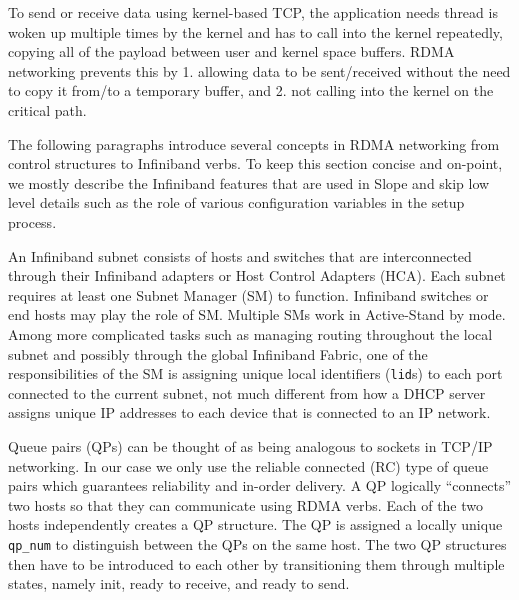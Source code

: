 To send or receive data using kernel-based TCP, the application needs thread
is woken up multiple times by the kernel and has to call into the kernel
repeatedly, copying all of the payload between user and kernel space buffers.
RDMA networking prevents this by 1. allowing data to be sent/received without
the need to copy it from/to a temporary buffer, and 2. not calling into the
kernel on the critical path.

The following paragraphs introduce several concepts in RDMA
networking from control structures to Infiniband verbs. To keep this section
concise and on-point, we mostly describe the Infiniband features that are used
in Slope and skip low level details such as the role of various configuration
variables in the setup process.

An Infiniband subnet consists of hosts and switches that are interconnected
through their Infiniband adapters or Host Control Adapters (HCA).
Each subnet requires at least one Subnet Manager (SM) to function.
Infiniband switches or end hosts may play the role of SM. Multiple SMs
work in Active-Stand by mode. Among more complicated tasks such as managing
routing throughout the local subnet and possibly through the global Infiniband
Fabric, one of the responsibilities of the SM is assigning unique local
identifiers (\texttt{lid}s) to each port connected to the current subnet, not much
different from how a DHCP server assigns unique IP addresses to each device
that is connected to an IP network.

Queue pairs (QPs) can be thought of as being analogous to sockets in TCP/IP
networking. In our case we only use the reliable connected (RC) type of queue
pairs which guarantees reliability and in-order delivery.
A QP logically ``connects'' two hosts so that they can communicate using
RDMA verbs. Each of the two hosts independently creates a QP structure. The
QP is assigned a locally unique \texttt{qp\_num} to distinguish between the
QPs on the same host. The two QP structures then have to be introduced to
each other by transitioning them through multiple states, namely init, ready to
receive, and ready to send.

